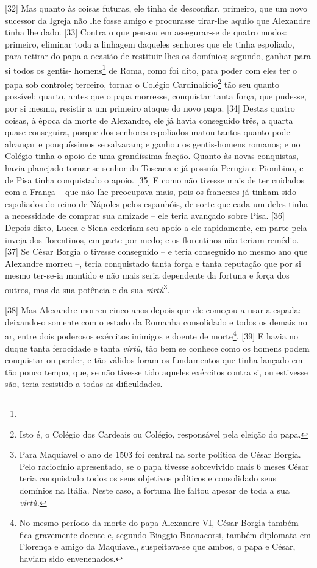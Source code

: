 {[}32{]} Mas quanto às coisas futuras, ele tinha de desconfiar,
primeiro, que um novo sucessor da Igreja não lhe fosse amigo e
procurasse tirar-lhe aquilo que Alexandre tinha lhe dado. {[}33{]}
Contra o que pensou em assegurar-se de quatro modos: primeiro, eliminar
toda a linhagem daqueles senhores que ele tinha espoliado, para retirar
do papa a ocasião de restituir-lhes os domínios; segundo, ganhar para si
todos os gentis- homens\footnote{} de Roma, como foi dito, para poder
com eles ter o papa sob controle; terceiro, tornar o Colégio
Cardinalício\footnote{Isto é, o Colégio dos Cardeais ou Colégio,
  responsável pela eleição do papa.} tão seu quanto possível; quarto,
antes que o papa morresse, conquistar tanta força, que pudesse, por si
mesmo, resistir a um primeiro ataque do novo papa. {[}34{]} Destas
quatro coisas, à época da morte de Alexandre, ele já havia conseguido
três, a quarta quase conseguira, porque dos senhores espoliados matou
tantos quanto pode alcançar e pouquíssimos se salvaram; e ganhou os
gentis-homens romanos; e no Colégio tinha o apoio de uma grandíssima
facção. Quanto às novas conquistas, havia planejado tornar-se senhor da
Toscana e já possuía Perugia e Piombino, e de Pisa tinha conquistado o
apoio. {[}35{]} E como não tivesse mais de ter cuidados com a França --
que não lhe preocupava mais, pois os franceses já tinham sido espoliados
do reino de Nápoles pelos espanhóis, de sorte que cada um deles tinha a
necessidade de comprar sua amizade -- ele teria avançado sobre Pisa.
{[}36{]} Depois disto, Lucca e Siena cederiam seu apoio a ele
rapidamente, em parte pela inveja dos florentinos, em parte por medo; e
os florentinos não teriam remédio. {[}37{]} Se César Borgia o tivesse
conseguido -- e teria conseguido no mesmo ano que Alexandre morreu --,
teria conquistado tanta força e tanta reputação que por si mesmo
ter-se-ia mantido e não mais seria dependente da fortuna e força dos
outros, mas da sua potência e da sua \emph{virtù}\footnote{Para
  Maquiavel o ano de 1503 foi central na sorte política de César Borgia.
  Pelo raciocínio apresentado, se o papa tivesse sobrevivido mais 6
  meses César teria conquistado todos os seus objetivos políticos e
  consolidado seus domínios na Itália. Neste caso, a fortuna lhe faltou
  apesar de toda a sua \emph{virtù.}}.

{[}38{]} Mas Alexandre morreu cinco anos depois que ele começou a usar a
espada: deixando-o somente com o estado da Romanha consolidado e todos
os demais no ar, entre dois poderosos exércitos inimigos e doente de
morte\footnote{No mesmo período da morte do papa Alexandre VI, César
  Borgia também fica gravemente doente e, segundo Biaggio Buonacorsi,
  também diplomata em Florença e amigo da Maquiavel, suspeitava-se que
  ambos, o papa e César, haviam sido envenenados.}. {[}39{]} E havia no
duque tanta ferocidade e tanta \emph{virtù}, tão bem se conhece como os
homens podem conquistar ou perder, e tão válidos foram os fundamentos
que tinha lançado em tão pouco tempo, que, se não tivesse tido aqueles
exércitos contra si, ou estivesse são, teria resistido a todas as
dificuldades.

